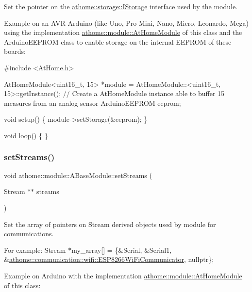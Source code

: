 Set the pointer on the \mbox{\hyperlink{classathome_1_1storage_1_1_i_storage}{athome\+::storage\+::\+I\+Storage}} interface used by the module.

Example on an A\+VR Arduino (like Uno, Pro Mini, Nano, Micro, Leonardo, Mega) using the implementation \mbox{\hyperlink{classathome_1_1module_1_1_at_home_module}{athome\+::module\+::\+At\+Home\+Module}} of this class and the Arduino\+E\+E\+P\+R\+OM class to enable storage on the internal E\+E\+P\+R\+OM of these boards\+:


\begin{DoxyCode}
\textcolor{preprocessor}{#include <AtHome.h>}

AtHomeModule<uint16\_t, 15> *module = AtHomeModule::<uint16\_t, 15>::getInstance(); \textcolor{comment}{// Create a AtHomeModule
       instance able to buffer 15 measures from an analog sensor}
ArduinoEEPROM eeprom;

\textcolor{keywordtype}{void} setup() \{
  module->setStorage(&eeprom);
\}

\textcolor{keywordtype}{void} loop() \{
\}
\end{DoxyCode}
 \mbox{\label{classathome_1_1module_1_1_a_base_module_af1af8e6110a8d0baee15efb2275ae5ae}} 
\subsubsection{\texorpdfstring{set\+Streams()}{setStreams()}}
{\footnotesize\ttfamily void athome\+::module\+::\+A\+Base\+Module\+::set\+Streams (\begin{DoxyParamCaption}\item[{Stream $\ast$$\ast$}]{streams }\end{DoxyParamCaption})}

Set the array of pointers on Stream derived objects used by module for communications.

For example\+: {\ttfamily Stream $\ast$my\+\_\+array\mbox{[}\mbox{]} = \{\&Serial, \&Serial1, \&\mbox{\hyperlink{classathome_1_1communication_1_1wifi_1_1_e_s_p8266_wi_fi_communicator}{athome\+::communication\+::wifi\+::\+E\+S\+P8266\+Wi\+Fi\+Communicator}}, nullptr\};}

Example on Arduino with the implementation \mbox{\hyperlink{classathome_1_1module_1_1_at_home_module}{athome\+::module\+::\+At\+Home\+Module}} of this class\+:


